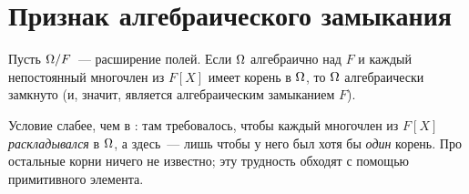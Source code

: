 \section{Признак алгебраического замыкания}

\begin{proposition}[6.5]
Пусть $\Omega/F$~--- расширение полей. Если $\Omega$ алгебраично над $F$ и каждый непостоянный многочлен из $F[X]$ имеет
корень в $\Omega$, то $\Omega$ алгебраически замкнуто (и, значит, является алгебраическим замыканием $F$).
\end{proposition}

Условие слабее, чем в : там требовалось, чтобы каждый многочлен из $F[X]$ \emph{раскладывался} в $\Omega$, а здесь~---
лишь чтобы у него был хотя бы \emph{один} корень. Про остальные корни ничего не известно; эту трудность обходят с
помощью примитивного элемента.

